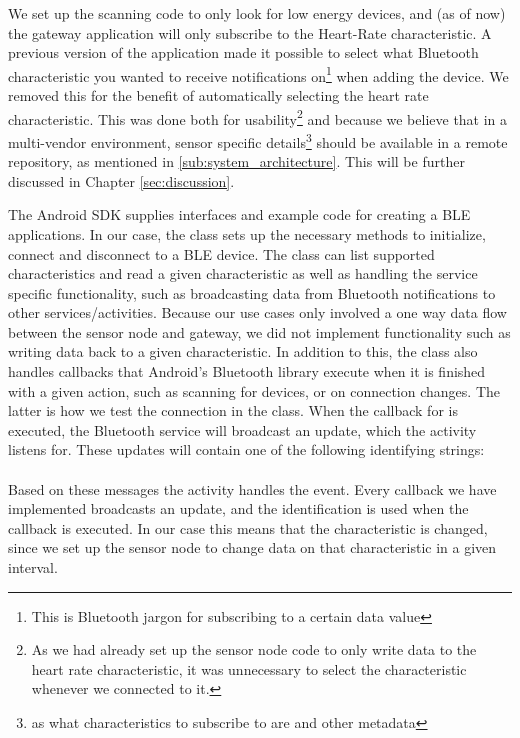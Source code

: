 We set up the scanning code to only look for low energy devices, and (as of now) the gateway application will only subscribe to the Heart-Rate characteristic. A previous version of the application made it possible to select what Bluetooth characteristic you wanted to receive notifications on\footnote{ This is Bluetooth jargon for subscribing to a certain data value} when adding the device. We removed this for the benefit of automatically selecting the heart rate characteristic. This was done both for usability\footnote{ As we had already set up the sensor node code to only write data to the heart rate characteristic, it was unnecessary to select the characteristic whenever we connected to it.} and because we believe that in a multi-vendor environment, sensor specific details\footnote{ as what characteristics to subscribe to are and other metadata} should be available in a remote repository, as mentioned in \ref{sub:system_architecture}. This will be further discussed in Chapter \ref{sec:discussion}.

The Android SDK supplies interfaces and example code for creating a BLE applications. In our case, the  class sets up the necessary methods to initialize, connect and disconnect to a BLE device. The class can list supported characteristics and read a given characteristic as well as handling the service specific functionality, such as broadcasting data from Bluetooth notifications to other services/activities. Because our use cases only involved a one way data flow between the sensor node and gateway, we did not implement functionality such as writing data back to a given characteristic. In addition to this, the class also handles callbacks that Android's Bluetooth library execute when it is finished with a given action, such as scanning for devices, or on connection changes. The latter is how we test the connection in the  class. When the callback for  is executed, the Bluetooth service will broadcast an update, which the  activity listens for. These updates will contain one of the following identifying strings:\\
\newline
\noindent{}
\\
\noindent
Based on these messages the  activity handles the event. Every callback we have implemented broadcasts an update, and the  identification is used when the callback  is executed. In our case this means that the  characteristic is changed, since we set up the sensor node to change data on that characteristic in a given interval.

